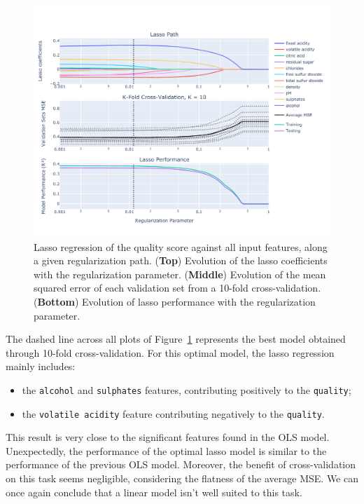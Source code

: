 \documentclass[12pt]{article}
\begin{document}
  \begin{figure}[!ht]
    \centering
    \includegraphics[width=\textwidth]{figures/lasso}
    \caption{Lasso regression of the quality score against all input features,
    along a given regularization path. (\textbf{Top}) Evolution of the lasso
    coefficients with the regularization parameter. (\textbf{Middle}) Evolution
    of the mean squared error of each validation set from a 10-fold
    cross-validation. (\textbf{Bottom}) Evolution of lasso performance with the
    regularization parameter.}%
    \label{fig:lasso}
  \end{figure} 

  The dashed line across all plots of Figure~\ref{fig:lasso} represents the
  best model obtained through 10-fold cross-validation. For this optimal model,
  the lasso regression mainly includes:
  \begin{itemize}
    \item the \lstinline{alcohol} and \lstinline{sulphates} features,
      contributing positively to the \lstinline{quality}; 
    \item the \lstinline{volatile acidity} feature contributing negatively to
      the \lstinline{quality}.
  \end{itemize}

  This result is very close to the significant features found in the OLS model.
  Unexpectedly, the performance of the optimal lasso model is similar to the
  performance of the previous OLS model. Moreover, the benefit of
  cross-validation on this task seems negligible, considering the flatness of
  the average MSE\@. We can once again conclude that a linear model isn't well
  suited to this task.
\end{document}
